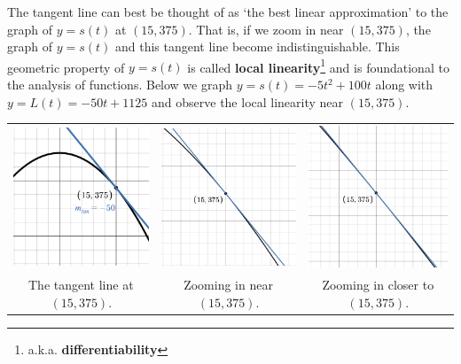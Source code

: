 \documentclass{ximera}
\begin{document}
The tangent line can best be thought of as `the best linear approximation' to the graph of $y = s(t)$ at $(15,375)$.  That is, if we zoom in near $(15,375)$, the graph of $y = s(t)$ and this tangent line become indistinguishable.  This geometric property of $y = s(t)$ is called \textbf{local linearity}\footnote{a.k.a. \textbf{differentiability}} and is foundational to the analysis of functions.   Below we graph $y = s(t) =  -5t^2+100t$ along with $y = L(t) = -50t + 1125$ and observe the local linearity near $(15, 375)$. 
  
  \medskip

\begin{center}

\begin{tabular}{ccc}

 \includegraphics[width=2in]{./IntroductiontoDerivativesGraphics/tangent.png} &  \includegraphics[width=2in]{./IntroductiontoDerivativesGraphics/tangentzoom1.png} &  \includegraphics[width=2in]{./IntroductiontoDerivativesGraphics/tangentzoom2.png} \\
 
 The tangent line at $(15, 375)$. & Zooming in near $(15, 375)$. & Zooming in closer to $(15, 375)$. \\
 
 \end{tabular}
 
 \end{center}
 
\end{document}
